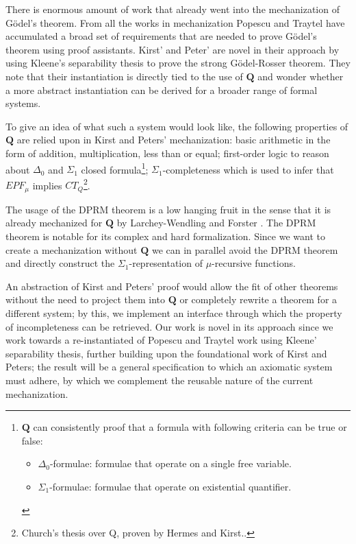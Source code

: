 \documentclass[a4paper]{scrartcl}
\begin{document}
There is enormous amount of work that already went into the mechanization of Gödel's theorem.  From all the works in mechanization Popescu and Traytel have accumulated a broad set of requirements that are needed to prove Gödel's theorem using proof assistants.\cite{popescu} Kirst' and Peter' are novel in their approach by using Kleene's separability thesis to prove the strong Gödel-Rosser theorem. They note that their instantiation is directly tied to the use of $\mathbf{Q}$ and wonder whether a more abstract instantiation can be derived for a broader range of formal systems. 

To give an idea of what such a system would look like, the following properties of $\mathbf{Q}$ are relied upon in Kirst and Peters' mechanization: basic arithmetic in the form of addition, multiplication, less than or equal; first-order logic to reason about $\Delta_0$ and $\Sigma_1$ closed formula\footnote{$\mathbf{Q}$ can consistently proof that a formula with following criteria can be true or false: \begin{itemize}
    \item $\Delta_0$-formulae: formulae that operate on a single free variable.
    \item $\Sigma_1$-formulae: formulae that operate on existential quantifier.
\end{itemize}}; $\Sigma_1$-completeness which is used to infer that $EPF_{\mu}$ implies $CT_{Q}$\footnote{Church's thesis over Q, proven by Hermes and Kirst.\cite{hermes_et_al:LIPIcs.FSCD.2022.9}.}.

The usage of the DPRM theorem is a low hanging fruit in the sense that it is already mechanized for $\mathbf{Q}$ by Larchey-Wendling and Forster \cite{larchey}. The DPRM theorem is notable for its complex and hard formalization. Since we want to create a mechanization without $\mathbf{Q}$ we can in parallel avoid the DPRM theorem and directly construct the $\Sigma_1$-representation of $\mu$-recursive functions.

An abstraction of Kirst and Peters' proof would allow the fit of other theorems without the need to project them into $\mathbf{Q}$ or completely rewrite a theorem for a different system; by this, we implement an interface through which the property of incompleteness can be retrieved. Our work is novel in its approach since we work towards a re-instantiated of Popescu and Traytel work using Kleene' separability thesis, further building upon the foundational work of Kirst and Peters; the result will be a general specification to which an axiomatic system must adhere, by which we complement the reusable nature of the current mechanization.
\end{document}
